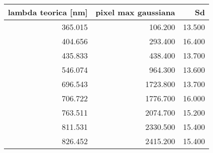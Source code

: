 \begin{tabular}{rrr}
\toprule
lambda teorica [nm] & pixel max gaussiana & Sd  \\
\midrule
365.015 & 106.200 & 13.500 \\
404.656 & 293.400 & 16.400 \\
435.833 & 438.400 & 13.700 \\
546.074 & 964.300 & 13.600 \\
696.543 & 1723.800 & 13.700 \\
706.722 & 1776.700 & 16.000 \\
763.511 & 2074.700 & 15.200 \\
811.531 & 2330.500 & 15.400 \\
826.452 & 2415.200 & 15.400 \\
\bottomrule
\end{tabular}
